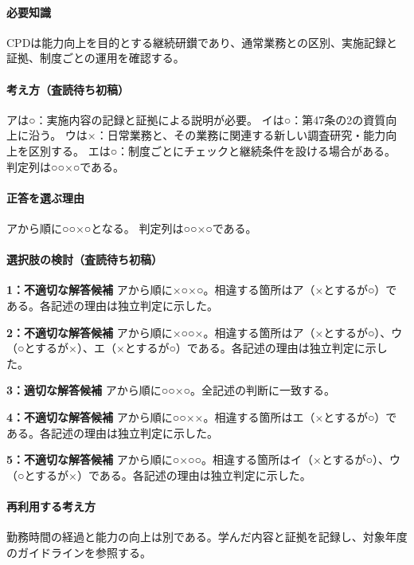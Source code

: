 \paragraph{必要知識} CPDは能力向上を目的とする継続研鑚であり、通常業務との区別、実施記録と証拠、制度ごとの運用を確認する。

\paragraph{考え方（査読待ち初稿）} アは○：実施内容の記録と証拠による説明が必要。 イは○：第47条の2の資質向上に沿う。 ウは×：日常業務と、その業務に関連する新しい調査研究・能力向上を区別する。 エは○：制度ごとにチェックと継続条件を設ける場合がある。 判定列は○○×○である。

\paragraph{正答を選ぶ理由} アから順に○○×○となる。  判定列は○○×○である。

\paragraph{選択肢の検討（査読待ち初稿）}\mbox{}\par

\noindent\textbf{1：不適切な解答候補} アから順に×○×○。相違する箇所はア（×とするが○）である。各記述の理由は独立判定に示した。\par

\noindent\textbf{2：不適切な解答候補} アから順に×○○×。相違する箇所はア（×とするが○）、ウ（○とするが×）、エ（×とするが○）である。各記述の理由は独立判定に示した。\par

\noindent\textbf{3：適切な解答候補} アから順に○○×○。全記述の判断に一致する。\par

\noindent\textbf{4：不適切な解答候補} アから順に○○××。相違する箇所はエ（×とするが○）である。各記述の理由は独立判定に示した。\par

\noindent\textbf{5：不適切な解答候補} アから順に○×○○。相違する箇所はイ（×とするが○）、ウ（○とするが×）である。各記述の理由は独立判定に示した。\par

\paragraph{再利用する考え方} 勤務時間の経過と能力の向上は別である。学んだ内容と証拠を記録し、対象年度のガイドラインを参照する。

